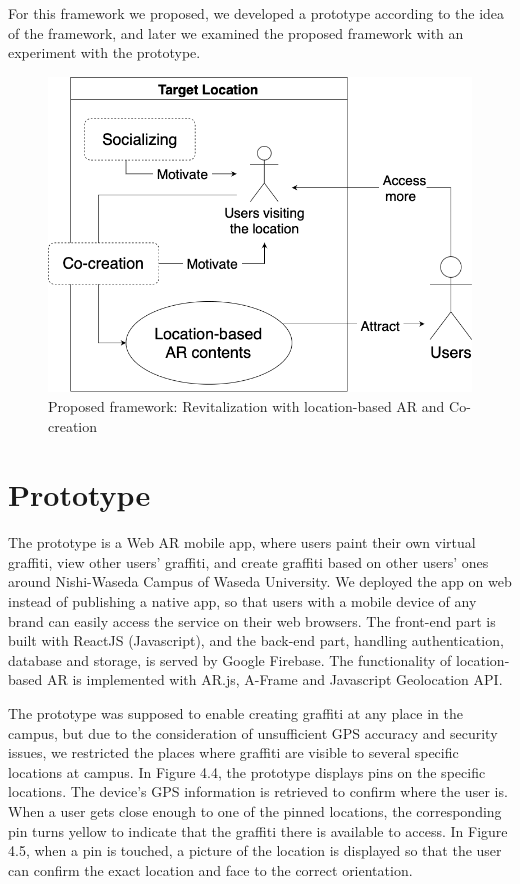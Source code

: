 For this framework we proposed, we developed a prototype according to the idea of the framework, and later we examined the proposed framework with an experiment with the prototype.

\begin{figure}
  \centering
  \includegraphics[width=0.8\columnwidth]{resources/4_methodology/revitalization_with_AR_and_cocreation.png}
    \caption{Proposed framework: Revitalization with location-based AR and Co-creation}
\end{figure}

\section{Prototype}
The prototype is a Web AR mobile app, where users paint their own virtual graffiti, view other users' graffiti, and create graffiti based on other users' ones around Nishi-Waseda Campus of Waseda University.
We deployed the app on web instead of publishing a native app, so that users with a mobile device of any brand can easily access the service on their web browsers.
The front-end part is built with ReactJS (Javascript), and the back-end part, handling authentication, database and storage, is served by Google Firebase.
The functionality of location-based AR is implemented with AR.js, A-Frame and Javascript Geolocation API.

The prototype was supposed to enable creating graffiti at any place in the campus, but due to the consideration of unsufficient GPS accuracy and security issues,
we restricted the places where graffiti are visible to several specific locations at campus.
In Figure 4.4, the prototype displays pins on the specific locations. The device's GPS information is retrieved to confirm where the user is.
When a user gets close enough to one of the pinned locations, the corresponding pin turns yellow to indicate that the graffiti there is available to access.
In Figure 4.5, when a pin is touched, a picture of the location is displayed so that the user can confirm the exact location and face to the correct orientation.

